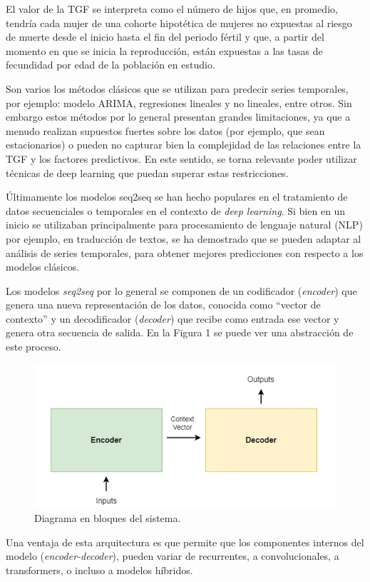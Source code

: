 \documentclass[
11pt, %
]{charter}
\begin{document}
El valor de la TGF se interpreta como el número de hijos que, en promedio, tendría cada mujer de una cohorte hipotética de mujeres no expuestas al riesgo de muerte desde el inicio hasta el fin del periodo fértil y que, a partir del momento en que se inicia la reproducción, están expuestas a las tasas de fecundidad por edad de la población en estudio.

Son varios los métodos clásicos que se utilizan para predecir series temporales, por ejemplo: modelo ARIMA, regresiones lineales y no lineales, entre otros. Sin embargo estos métodos por lo general presentan grandes limitaciones, ya que a menudo realizan supuestos fuertes sobre los datos (por ejemplo, que sean estacionarios) o pueden no capturar bien la complejidad de las relaciones entre la TGF y los factores predictivos. En este sentido, se torna relevante poder utilizar técnicas de deep learning que puedan superar estas restricciones.

Últimamente los modelos seq2seq se han hecho populares en el tratamiento de datos secuenciales o temporales en el contexto de \textit{deep learning}. Si bien en un inicio se utilizaban principalmente para procesamiento de lenguaje natural (NLP) por ejemplo, en traducción de textos, se ha demostrado que se pueden adaptar al análisis de series temporales, para obtener mejores predicciones con respecto a los modelos clásicos.

Los modelos \textit{seq2seq} por lo general se componen de un codificador (\textit{encoder}) que genera una nueva representación de los datos, conocida como “vector de contexto” y un decodificador (\textit{decoder}) que recibe como entrada ese vector y genera otra secuencia de salida. En la Figura 1 se puede ver una abstracción de este proceso.

\begin{figure}[htpb]
	\centering 
	\includegraphics[width=.65\textwidth]{./Figuras/Fig1.png}
	\caption{Diagrama en bloques del sistema.}
	\label{fig:diagBloques}
\end{figure}

Una ventaja de esta arquitectura es que permite que los componentes internos del modelo (\textit{encoder-decoder}), pueden variar de recurrentes, a convolucionales, a transformers, o incluso a modelos híbridos.
\end{document}
